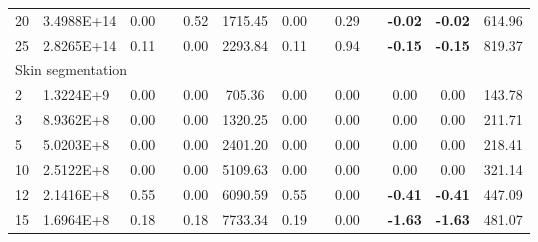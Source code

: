 {\begin{longtable}{@{}llccccccccccc@{}}
\multicolumn{1}{l|}{20} & \multicolumn{1}{l|}{3.4988E+14} & 0.00 & \multicolumn{1}{c|}{}    & 0.52 & \multicolumn{1}{c|}{1715.45}  & 0.00 & \multicolumn{1}{c|}{}    & 0.29 & \multicolumn{1}{c|}{}    & \textbf{-0.02}  & \textbf{-0.02}  & 614.96  \\
\multicolumn{1}{l|}{25} & \multicolumn{1}{l|}{2.8265E+14} & 0.11 & \multicolumn{1}{c|}{}    & 0.00 & \multicolumn{1}{c|}{2293.84}  & 0.11 & \multicolumn{1}{c|}{}    & 0.94 & \multicolumn{1}{c|}{}    & \textbf{-0.15}  & \textbf{-0.15}  & 819.37  \\ \hline
\multicolumn{13}{l}{Skin segmentation}                                                                                                                                                                                                               \\ \hline
\multicolumn{1}{l|}{2}  & \multicolumn{1}{l|}{1.3224E+9}  & 0.00 & \multicolumn{1}{c|}{}    & 0.00 & \multicolumn{1}{c|}{705.36}   & 0.00 & \multicolumn{1}{c|}{}    & 0.00 & \multicolumn{1}{c|}{}    & 0.00            & 0.00            & 143.78  \\
\multicolumn{1}{l|}{3}  & \multicolumn{1}{l|}{8.9362E+8}  & 0.00 & \multicolumn{1}{c|}{}    & 0.00 & \multicolumn{1}{c|}{1320.25}  & 0.00 & \multicolumn{1}{c|}{}    & 0.00 & \multicolumn{1}{c|}{}    & 0.00            & 0.00            & 211.71  \\
\multicolumn{1}{l|}{5}  & \multicolumn{1}{l|}{5.0203E+8}  & 0.00 & \multicolumn{1}{c|}{}    & 0.00 & \multicolumn{1}{c|}{2401.20}  & 0.00 & \multicolumn{1}{c|}{}    & 0.00 & \multicolumn{1}{c|}{}    & 0.00            & 0.00            & 218.41  \\
\multicolumn{1}{l|}{10} & \multicolumn{1}{l|}{2.5122E+8}  & 0.00 & \multicolumn{1}{c|}{}    & 0.00 & \multicolumn{1}{c|}{5109.63}  & 0.00 & \multicolumn{1}{c|}{}    & 0.00 & \multicolumn{1}{c|}{}    & 0.00            & 0.00            & 321.14  \\
\multicolumn{1}{l|}{12} & \multicolumn{1}{l|}{2.1416E+8}  & 0.55 & \multicolumn{1}{c|}{}    & 0.00 & \multicolumn{1}{c|}{6090.59}  & 0.55 & \multicolumn{1}{c|}{}    & 0.00 & \multicolumn{1}{c|}{}    & \textbf{-0.41}  & \textbf{-0.41}  & 447.09  \\
\multicolumn{1}{l|}{15} & \multicolumn{1}{l|}{1.6964E+8}  & 0.18 & \multicolumn{1}{c|}{}    & 0.18 & \multicolumn{1}{c|}{7733.34}  & 0.19 & \multicolumn{1}{c|}{}    & 0.00 & \multicolumn{1}{c|}{}    & \textbf{-1.63}  & \textbf{-1.63}  & 481.07  \\

\end{longtable}}
